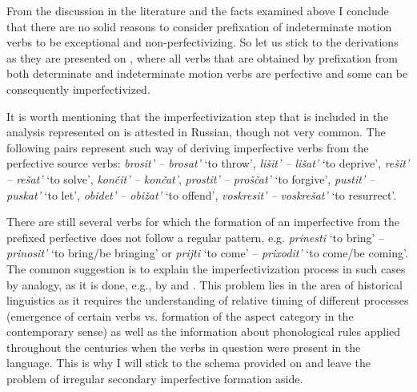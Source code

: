 From the discussion in the literature and the facts examined above I conclude that there are no solid reasons to consider prefixation of indeterminate motion verbs to be exceptional and non-perfectivizing. So let us stick to the derivations as they are presented on , where all verbs that are obtained by prefixation from both determinate and indeterminate motion verbs are perfective and some can be consequently imperfectivized.

It is worth mentioning that the imperfectivization step that is included in the analysis represented on  is attested in Russian, though not very common. The following pairs represent such way of deriving imperfective verbs from the perfective source verbs: \textit{brosit'\textsuperscript{\PF} -- brosat'\textsuperscript{\IPF}} `to throw', \textit{li\v{s}it'\textsuperscript{\PF} -- li\v{s}at'\textsuperscript{\IPF}} `to deprive', \textit{re\v{s}it'\textsuperscript{\PF} -- re\v{s}at'\textsuperscript{\IPF}} `to solve', \textit{kon\v{c}it'\textsuperscript{\PF} -- kon\v{c}at'\textsuperscript{\IPF}}, \textit{prostit'\textsuperscript{\PF} -- pro\v{s}\v{c}at'\textsuperscript{\IPF}} `to forgive', \textit{pustit'\textsuperscript{\PF} -- puskat'\textsuperscript{\IPF}} `to let', \textit{obidet'\textsuperscript{\PF} -- obi\v{z}at'\textsuperscript{\IPF}} `to offend', \textit{voskresit'\textsuperscript{\PF} -- voskre\v{s}at'\textsuperscript{\IPF}} `to resurrect'.

There are still several verbs for which the formation of an imperfective from the prefixed perfective does not follow a regular pattern, e.g. \textit{prinesti}\textsuperscript{\PF} `to bring' -- \textit{prinosit'}\textsuperscript{\IPF} `to bring/be bringing' or \textit{prijti}\textsuperscript{\PF} `to come' -- \textit{prixodit'}\textsuperscript{\IPF} `to come/be coming'. The common suggestion is to explain the imperfectivization process in such cases by analogy, as it is done, e.g., by \citet{Regnell:44} and \citet[589]{Shvedova:82}. This problem lies in the area of historical linguistics as it requires the understanding of relative timing of different processes (emergence of certain verbs vs. formation of the aspect category in the contemporary sense) as well as the information about phonological rules applied throughout the centuries when the verbs in question were present in the language. This is why I will stick to the schema provided on  and leave the problem of irregular secondary imperfective formation aside.

